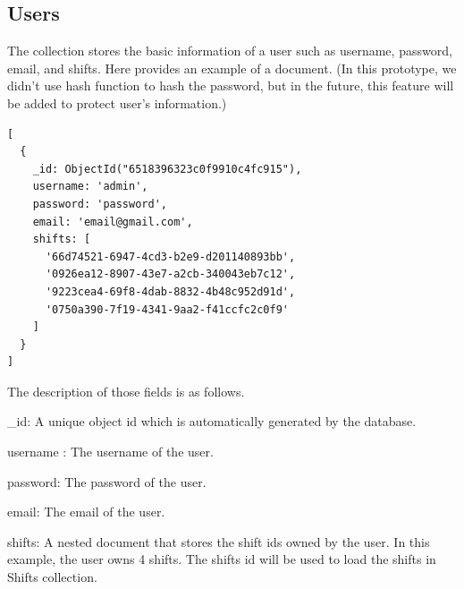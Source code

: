 \documentclass[11pt, oneside]{article}   	%
\begin{document}
\subsection{Users}
The collection stores the basic information of a user such as username, password, email, and shifts. Here provides an example of a document. (In this prototype, we didn't use hash function to hash the password, but in the future, this feature will be added to protect user's information.)

\begin{verbatim}
[
  {
    _id: ObjectId("6518396323c0f9910c4fc915"),
    username: 'admin',
    password: 'password',
    email: 'email@gmail.com',
    shifts: [
      '66d74521-6947-4cd3-b2e9-d201140893bb',
      '0926ea12-8907-43e7-a2cb-340043eb7c12',
      '9223cea4-69f8-4dab-8832-4b48c952d91d',
      '0750a390-7f19-4341-9aa2-f41ccfc2c0f9'
    ]
  }
]
\end{verbatim}
The description of those fields is as follows.
\begin{compactenum}[1.]
\item \_id: A unique object id which is automatically generated by the database.
\item username : The username of the user.
\item password: The password of the user.
\item email: The email of the user.
\item shifts: A nested document that stores the shift ids owned by the user. In this example, the user owns 4 shifts. The shifts id will be used to load the shifts in Shifts collection.
\end{compactenum}
\end{document}
